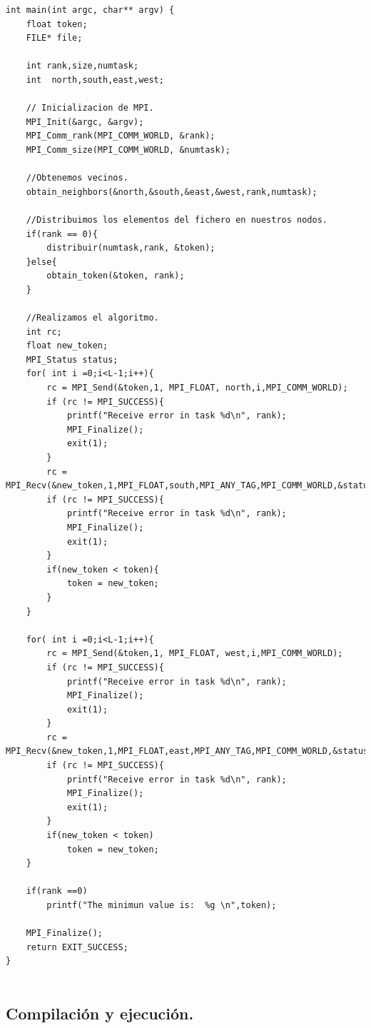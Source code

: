 \documentclass{article}
\begin{document}
\begin{lstlisting}
int main(int argc, char** argv) {
    float token;
    FILE* file;
    
    int rank,size,numtask;
    int  north,south,east,west;
    
    // Inicializacion de MPI.
    MPI_Init(&argc, &argv);
    MPI_Comm_rank(MPI_COMM_WORLD, &rank);
    MPI_Comm_size(MPI_COMM_WORLD, &numtask);
    
    //Obtenemos vecinos.
    obtain_neighbors(&north,&south,&east,&west,rank,numtask);
    
    //Distribuimos los elementos del fichero en nuestros nodos.
    if(rank == 0){
        distribuir(numtask,rank, &token);
    }else{
        obtain_token(&token, rank);
    }
    
    //Realizamos el algoritmo.
    int rc;
    float new_token;
    MPI_Status status;
    for( int i =0;i<L-1;i++){
        rc = MPI_Send(&token,1, MPI_FLOAT, north,i,MPI_COMM_WORLD);
        if (rc != MPI_SUCCESS){
            printf("Receive error in task %d\n", rank);
            MPI_Finalize();
            exit(1);
        }
        rc = MPI_Recv(&new_token,1,MPI_FLOAT,south,MPI_ANY_TAG,MPI_COMM_WORLD,&status);
        if (rc != MPI_SUCCESS){
            printf("Receive error in task %d\n", rank);
            MPI_Finalize();
            exit(1);
        }
        if(new_token < token){
            token = new_token;
        }
    }
    
    for( int i =0;i<L-1;i++){
        rc = MPI_Send(&token,1, MPI_FLOAT, west,i,MPI_COMM_WORLD);
        if (rc != MPI_SUCCESS){
            printf("Receive error in task %d\n", rank);
           	MPI_Finalize();
            exit(1);
        }
        rc = MPI_Recv(&new_token,1,MPI_FLOAT,east,MPI_ANY_TAG,MPI_COMM_WORLD,&status);
        if (rc != MPI_SUCCESS){
            printf("Receive error in task %d\n", rank);
            MPI_Finalize();
            exit(1);
        }
        if(new_token < token)
            token = new_token;
    }
    
    if(rank ==0)
        printf("The minimun value is:  %g \n",token);
    
    MPI_Finalize();
    return EXIT_SUCCESS;
}


\end{lstlisting}

\subsection{Compilación y ejecución.}
\end{document}
